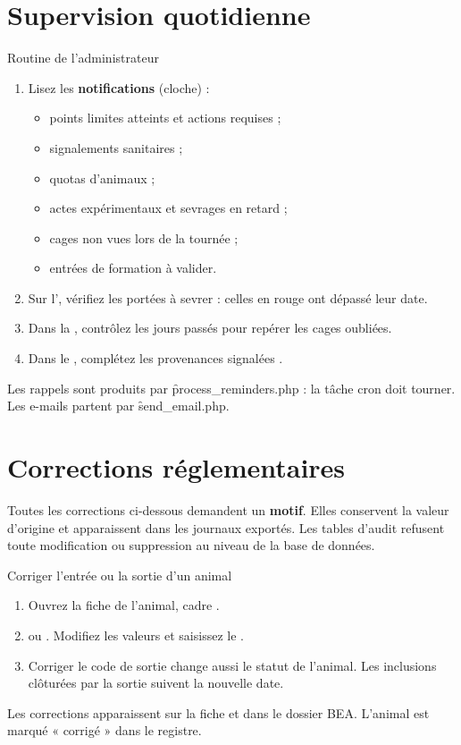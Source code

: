 \documentclass[11pt,a4paper]{article}
\begin{document}
\section{Supervision quotidienne}
\begin{procedure}{Routine de l'administrateur}
\begin{enumerate}
  \item Lisez les \textbf{notifications} (cloche) :
    \begin{itemize}
      \item points limites atteints et actions requises ;
      \item signalements sanitaires ;
      \item quotas d'animaux ;
      \item actes expérimentaux et sevrages en retard ;
      \item cages non vues lors de la tournée ;
      \item entrées de formation à valider.
    \end{itemize}
  \item Sur l', vérifiez les portées à sevrer : celles en
    rouge ont dépassé leur date.
  \item Dans la , contrôlez les jours passés pour
    repérer les cages oubliées.
  \item Dans le , complétez les
    provenances signalées .
\end{enumerate}
\end{procedure}
Les rappels sont produits par \f{process_reminders.php} : la tâche cron doit
tourner. Les e-mails partent par \f{send_email.php}.

\section{Corrections réglementaires}
\begin{trace}
Toutes les corrections ci-dessous demandent un \textbf{motif}. Elles
conservent la valeur d'origine et apparaissent dans les journaux exportés.
Les tables d'audit refusent toute modification ou suppression au niveau de la
base de données.
\end{trace}

\begin{procedure}{Corriger l'entrée ou la sortie d'un animal}
\begin{enumerate}
  \item Ouvrez la fiche de l'animal, cadre .
  \item {} ou . Modifiez les valeurs et saisissez le .
  \item Corriger le code de sortie change aussi le statut de l'animal. Les
    inclusions clôturées par la sortie suivent la nouvelle date.
\end{enumerate}
\end{procedure}
Les corrections apparaissent sur la fiche et dans le dossier BEA. L'animal
est marqué « corrigé » dans le registre.
\end{document}
